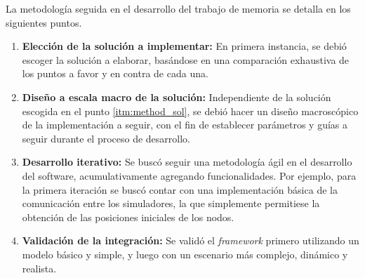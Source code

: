 La metodología seguida en el desarrollo del trabajo de memoria se detalla en los siguientes puntos.

\begin{enumerate}
    \item \label{itm:method_sol} \textbf{Elección de la solución a implementar:} En primera instancia, se debió escoger la solución a elaborar, basándose en una comparación exhaustiva de los puntos a favor y en contra de cada una. 
    
    \item \textbf{Diseño a escala macro de la solución:} Independiente de la solución escogida en el punto \ref{itm:method_sol}, se debió hacer un diseño macroscópico de la implementación a seguir, con el fin de establecer parámetros y guías a seguir durante el proceso de desarrollo. 
    
    \item \textbf{Desarrollo iterativo:} Se buscó seguir una metodología ágil en el desarrollo del software, acumulativamente agregando funcionalidades. Por ejemplo, para la primera iteración se buscó contar con una implementación básica de la comunicación entre los simuladores, la que simplemente permitiese la obtención de las posiciones iniciales de los nodos.
    
    \item \textbf{Validación de la integración:} Se validó el \textit{framework} primero utilizando un modelo básico y simple, y luego con un escenario más complejo, dinámico y realista. 
\end{enumerate}
